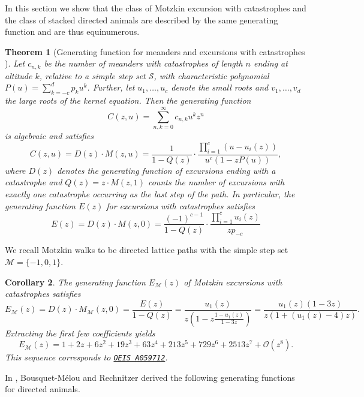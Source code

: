 \documentclass{article}
\newtheorem{theorem}{Theorem}
\newtheorem{corollary}[theorem]{Corollary}
\theoremstyle{definition}
\begin{document}
In this section we show that the class of Motzkin excursion with catastrophes and the class of stacked directed animals are described by the same generating function and are thus equinumerous.

\begin{theorem}[Generating function for meanders and excursions with catastrophes {\cite[Theorem 2.1]{Catastrophes}}] \label{thm:gf_catastrophes}
  Let $c_{n,k}$ be the number of meanders with catastrophes of length $n$ ending at altitude $k$, relative to a simple step set $\mathcal{S}$, with characteristic polynomial $P(u) = \sum_{k=-c}^d p_k u^k$.
  Further, let $u_1,\dots,u_c$ denote the small roots and $v_1,\dots,v_d$ the large roots of the kernel equation.
  Then the generating function 
  $$
  C(z,u) = \sum_{n,k = 0}^\infty c_{n,k} u^k z^n
  $$ 
  is algebraic and satisfies 
  \begin{equation*}
    C(z,u) = D(z) \cdot M(z,u) = \frac{1}{1 - Q(z)} \cdot \frac{\prod_{i=1}^c(u - u_i(z))}{u^c(1 - zP(u))},
  \end{equation*}
  where $D(z)$ denotes the generating function of excursions ending with a catastrophe and $Q(z) = z \cdot M(z, 1)$ counts the number of excursions with exactly one catastrophe occurring as the last step of the path. In particular, the generating function $E(z)$ for excursions with catastrophes satisfies
  \[
    E(z) = D(z) \cdot M(z,0) = \frac{(-1)^{c-1}}{1 - Q(z)} \cdot \frac{\prod_{i=1}^c u_i(z)}{z p_{-c}}
  \]
\end{theorem}

We recall Motzkin walks to be directed lattice paths with the simple step set $\mathcal{M} = \{-1,0,1\}$.

\begin{corollary} \label{ex:motzkin_excursions}
  The generating function $E_\mathcal{M}(z)$ of Motzkin excursions with catastrophes satisfies 
  $$
    E_\mathcal{M}(z) = D(z) \cdot M_{\mathcal{M}}(z, 0) = \frac{E(z)}{1 - Q(z)} = \frac{u_1(z)}{z\left(1 - z\frac{1 - u_1(z)}{1 - 3z}\right)} = \frac{u_{1}(z)(1 - 3z)}{z(1 + (u_{1}(z) - 4)z)}.
  $$
  Extracting the first few coefficients yields 
  $$ 
    E_\mathcal{M}(z) = 1 + 2z + 6z^{2} + 19z^{3} + 63z^{4} + 213z^{5} + 729z^{6} + 2513z^{7} + \mathcal{O}(z^{8}).
  $$
  This sequence corresponds to \href{https://oeis.org/A059712}{\texttt{OEIS A059712}}.
\end{corollary}

In \cite{LatticeAnimals}, Bousquet-Mélou and Rechnitzer derived the following generating functions for directed animals.
\end{document}
